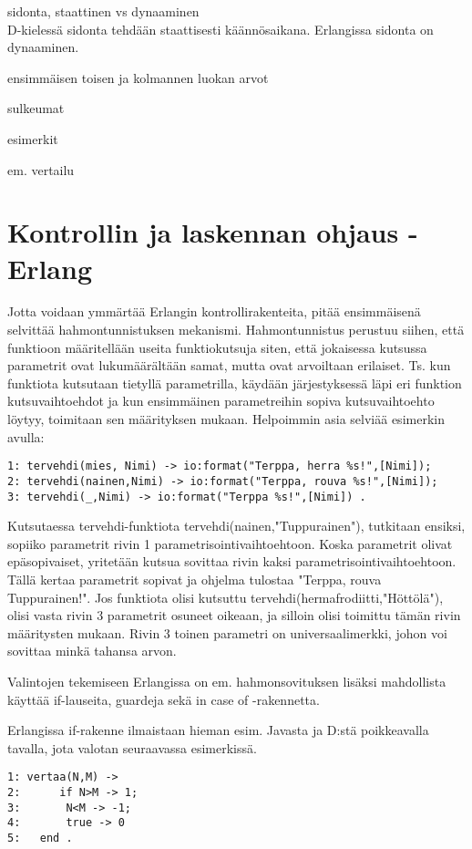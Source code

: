 \documentclass[11pt,oneside,a4paper]{article}
\begin{document}
sidonta, staattinen vs dynaaminen \\
D-kielessä sidonta tehdään staattisesti käännösaikana. Erlangissa sidonta on dynaaminen.

ensimmäisen toisen ja kolmannen luokan arvot

sulkeumat

esimerkit

em. vertailu

\section{Kontrollin ja laskennan ohjaus - Erlang}
Jotta voidaan ymmärtää Erlangin kontrollirakenteita, pitää ensimmäisenä
selvittää hahmontunnistuksen mekanismi. Hahmontunnistus perustuu siihen, että
funktioon määritellään useita funktiokutsuja siten, että jokaisessa kutsussa
parametrit ovat lukumäärältään samat, mutta ovat arvoiltaan erilaiset. Ts. kun 
funktiota kutsutaan tietyllä parametrilla, käydään järjestyksessä läpi eri
funktion kutsuvaihtoehdot ja kun ensimmäinen parametreihin sopiva
kutsuvaihtoehto löytyy, 
toimitaan sen määrityksen mukaan. Helpoimmin asia selviää esimerkin avulla: 
\begin{verbatim}
1: tervehdi(mies, Nimi) -> io:format("Terppa, herra %s!",[Nimi]);
2: tervehdi(nainen,Nimi) -> io:format("Terppa, rouva %s!",[Nimi]);
3: tervehdi(_,Nimi) -> io:format("Terppa %s!",[Nimi]) . 
\end{verbatim}


Kutsutaessa tervehdi-funktiota tervehdi(nainen,"Tuppurainen"), tutkitaan
ensiksi, sopiiko parametrit  rivin 1 parametrisointivaihtoehtoon. Koska
parametrit olivat epäsopivaiset, 
yritetään kutsua sovittaa rivin kaksi parametrisointivaihtoehtoon. Tällä kertaa
parametrit sopivat ja ohjelma tulostaa "Terppa, rouva Tuppurainen!". Jos
funktiota olisi kutsuttu
tervehdi(hermafrodiitti,"Höttölä"), olisi vasta rivin 3 parametrit osuneet
oikeaan, ja silloin olisi toimittu tämän rivin määritysten mukaan. 
Rivin 3 toinen parametri on universaalimerkki, 
johon voi sovittaa minkä tahansa arvon.

Valintojen tekemiseen Erlangissa on em. hahmonsovituksen lisäksi mahdollista
käyttää if-lauseita, guardeja sekä in case of -rakennetta.

Erlangissa if-rakenne ilmaistaan hieman esim. Javasta ja D:stä poikkeavalla
tavalla, jota valotan seuraavassa esimerkissä. 

\begin{verbatim}
1: vertaa(N,M) -> 
2: 		if N>M -> 1;
3:	     N<M -> -1;
4:	     true -> 0
5: 	 end . 
\end{verbatim}
\end{document}
